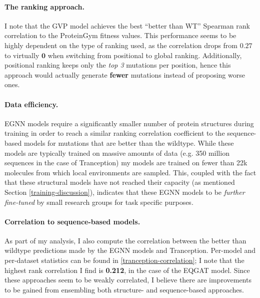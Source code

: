 \paragraph{The ranking approach.}
I note that the GVP model achieves the best ``better than WT'' Spearman rank correlation to the ProteinGym fitness values. This performance seems to be highly dependent on the type of ranking used, as the correlation drops from $\mathbf{0.27}$ to virtually $\mathbf{0}$ when switching from positional to global ranking. Additionally, positional ranking keeps only the \textit{top 3} mutations per position, hence this approach would actually generate \textbf{fewer} mutations instead of proposing worse ones. 

\paragraph{Data efficiency.}
EGNN models require a significantly smaller number of protein structures during training in order to reach a similar ranking correlation coefficient to the sequence-based models for mutations that are better than the wildtype. While these models are typically trained on massive amounts of data (e.g. 350 million sequences in the case of Tranception) my models are trained on fewer than 22k molecules from which local environments are sampled. This, coupled with the fact that these structural models have not reached their capacity (as mentioned Section \ref{training-discussion}), indicates that these EGNN models to be \textit{further fine-tuned} by small research groups for task specific purposes. 

\paragraph{Correlation to sequence-based models.}
As part of my analysis, I also compute the correlation between the better than wildtype predictions made by the EGNN models and Tranception. Per-model and per-dataset statistics can be found in \ref{tranception-correlation}; I note that the highest rank correlation I find is \textbf{0.212}, in the case of the EQGAT model. Since these approaches seem to be weakly correlated, I believe there are improvements to be gained from ensembling both structure- and sequence-based approaches.

